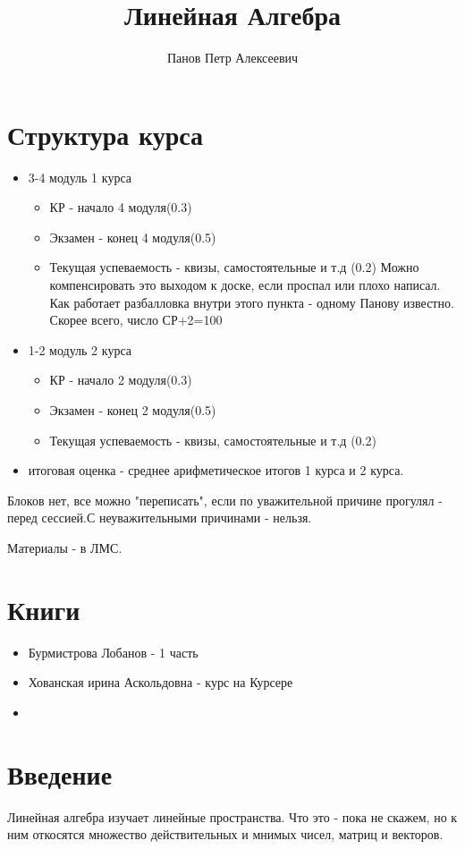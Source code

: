 \documentclass{article}
\title{Линейная Алгебра}
\author{Панов Петр Алексеевич}
\begin{document}
\maketitle
 
\tableofcontents

\section*{Структура курса}
\begin{itemize}
\item 3-4 модуль 1 курса
\begin{itemize}
\item КР - начало 4 модуля(0.3)
\item Экзамен - конец 4 модуля(0.5)
\item Текущая успеваемость - квизы, самостоятельные и т.д (0.2)
Можно компенсировать это выходом к доске, если проспал или плохо написал. Как работает разбалловка внутри этого пункта - одному Панову известно. Скорее всего, число СР+2=100%
\end{itemize}

\item 1-2 модуль 2 курса
\begin{itemize}
\item КР - начало 2 модуля(0.3)
\item Экзамен - конец 2 модуля(0.5)
\item Текущая успеваемость - квизы, самостоятельные и т.д (0.2)
\end{itemize}
\item итоговая оценка - среднее арифметическое итогов 1 курса и 2 курса.
\end{itemize}

Блоков нет, все можно "переписать", если по уважительной причине прогулял - перед сессией.С неуважительными причинами - нельзя.

Материалы - в ЛМС.

\section*{Книги}
\begin{itemize}
\item Бурмистрова Лобанов - 1 часть
\item Хованская ирина Аскольдовна - курс на Курсере
\item
\end{itemize}

\section*{Введение}
Линейная алгебра изучает линейные пространства. Что это - пока не скажем, но к ним откосятся множество действительных и мнимых чисел, матриц и векторов.
\end{document}
